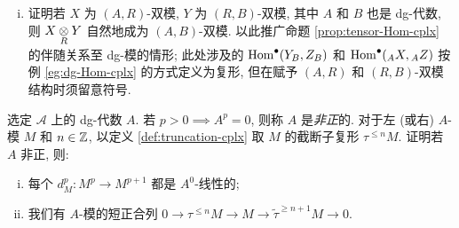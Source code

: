 \begin{Exercises}
\begin{enumerate}[(i)]
		\item 证明若 $X$ 为 $(A, R)$-双模, $Y$ 为 $(R, B)$-双模, 其中 $A$ 和 $B$ 也是 dg-代数, 则 $X \underset{R}{\otimes} Y$ 自然地成为 $(A, B)$-双模. 以此推广命题 \ref{prop:tensor-Hom-cplx} 的伴随关系至 dg-模的情形; 此处涉及的 $\operatorname{Hom}^\bullet(Y_B, Z_B)$ 和 $\operatorname{Hom}^\bullet({}_A X, {}_A Z)$ 按例 \ref{eg:dg-Hom-cplx} 的方式定义为复形, 但在赋予 $(A, R)$ 和 $(R, B)$-双模结构时须留意符号.
	\end{enumerate}

	\item 选定 $\mathcal{A}$ 上的 dg-代数 $A$. 若 $p > 0 \implies A^p = 0$, 则称 $A$ 是\emph{非正}的. 对于左 (或右) $A$-模 $M$ 和 $n \in \mathbb{Z}$, 以定义 \ref{def:truncation-cplx} 取 $M$ 的截断子复形 $\tau^{\leq n} M$. 证明若 $A$ 非正, 则:
	\begin{enumerate}[(i)]
		\item 每个 $d_M^p: M^p \to M^{p+1}$ 都是 $A^0$-线性的;
		\item 我们有 $A$-模的短正合列 $0 \to \tau^{\leq n} M \to M \to \tilde{\tau}^{\geq n+1} M \to 0$.
	\end{enumerate}
	

\end{Exercises}
